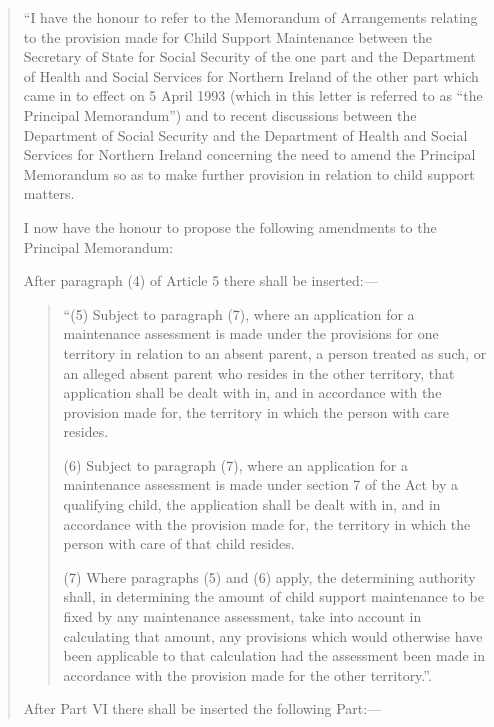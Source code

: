 \documentclass[a4paper]{article}
\begin{document}
\begin{quotation}
  “I have the honour to refer to the Memorandum of Arrangements relating to the provision made for Child Support Maintenance between the Secretary of State for Social Security of the one part and the Department of Health and Social Services for Northern Ireland of the other part which came in to effect on 5 April 1993 (which in this letter is referred to as “the Principal Memorandum”) and to recent discussions between the Department of Social Security and the Department of Health and Social Services for Northern Ireland concerning the need to amend the Principal Memorandum so as to make further provision in relation to child support matters.

\begin{sloppypar}
  I now have the honour to propose the following amendments to the Principal Memorandum:
\end{sloppypar}

\begin{sloppypar}
  After paragraph (4) of Article 5 there shall be inserted:—
\end{sloppypar}
\begin{quotation}
 “(5) Subject to paragraph (7), where an application for a maintenance assessment is made under the provisions for one territory in relation to an absent parent, a person treated as such, or an alleged absent parent who resides in the other territory, that application shall be dealt with in, and in accordance with the provision made for, the territory in which the person with care resides.

(6) Subject to paragraph (7), where an application for a maintenance assessment is made under section 7 of the Act by a qualifying child, the application shall be dealt with in, and in accordance with the provision made for, the territory in which the person with care of that child resides.

\begin{sloppypar}
(7) Where paragraphs (5) and (6) apply, the determining authority shall, in determining the amount of child support maintenance to be fixed by any maintenance assessment, take into account in calculating that amount, any provisions which would otherwise have been applicable to that calculation had the assessment been made in accordance with the provision made for the other territory.”.
\end{sloppypar}
\end{quotation}

  After Part VI there shall be inserted the following Part:—
\begin{quotation}

\end{quotation}
\end{quotation}
\end{document}
